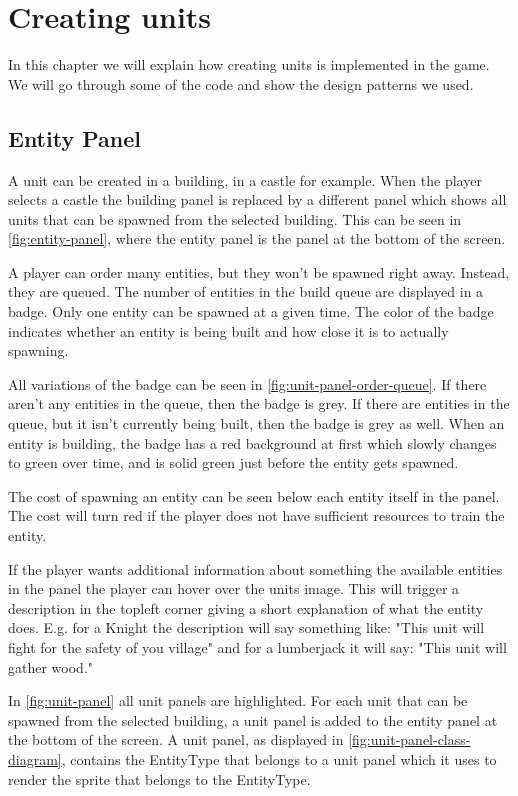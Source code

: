 \section{Creating units}
In this chapter we will explain how creating units is implemented in the game. We will go through some of the code and show the design patterns we used.

\subsection{Entity Panel} \label{sec:EntityPanel}
A unit can be created in a building, in a castle for example. When the player selects a castle the building panel is replaced by a different panel which shows all units that can be spawned from the selected building. This can be seen in \cref{fig:entity-panel}, where the entity panel is the panel at the bottom of the screen. 

A player can order many entities, but they won't be spawned right away. Instead, they are queued. The number of entities in the build queue are displayed in a badge. Only one entity can be spawned at a given time. The color of the badge indicates whether an entity is being built and how close it is to actually spawning. 

All variations of the badge can be seen in \cref{fig:unit-panel-order-queue}. If there aren't any entities in the queue, then the badge is grey. If there are entities in the queue, but it isn't currently being built, then the badge is grey as well. When an entity is building, the badge has a red background at first which slowly changes to green over time, and is solid green just before the entity gets spawned.

The cost of spawning an entity can be seen below each entity itself in the panel. The cost will turn red if the player does not have sufficient resources to train the entity. 

If the player wants additional information about something the available entities in the panel the player can hover over the units image. This will trigger a description in the topleft corner giving a short explanation of what the entity does. E.g. for a Knight the description will say something like: "This unit will fight for the safety of you village" and for a lumberjack it will say: "This unit will gather wood."

In \cref{fig:unit-panel} all unit panels are highlighted. For each unit that can be spawned from the selected building, a unit panel is added to the entity panel at the bottom of the screen. A unit panel, as displayed in \cref{fig:unit-panel-class-diagram}, contains the EntityType that belongs to a unit panel which it uses to render the sprite that belongs to the EntityType.

